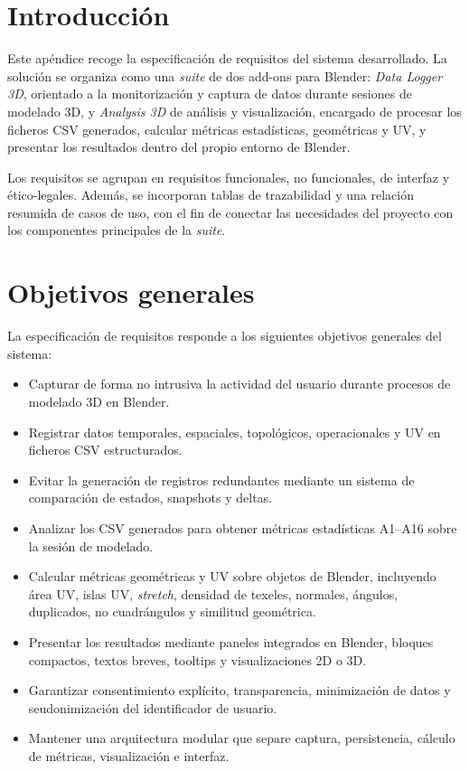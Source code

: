 \label{apendice:especificacion_requisitos}

\section{Introducción}

Este apéndice recoge la especificación de requisitos del sistema desarrollado. La solución se organiza como una \textit{suite} de dos add-ons para Blender: \textit{Data Logger 3D}, orientado a la monitorización y captura de datos durante sesiones de modelado 3D, y \textit{Analysis 3D} de análisis y visualización, encargado de procesar los ficheros CSV generados, calcular métricas estadísticas, geométricas y UV, y presentar los resultados dentro del propio entorno de Blender.

Los requisitos se agrupan en requisitos funcionales, no funcionales, de interfaz y ético-legales. Además, se incorporan tablas de trazabilidad y una relación resumida de casos de uso, con el fin de conectar las necesidades del proyecto con los componentes principales de la \textit{suite}.

\section{Objetivos generales}

La especificación de requisitos responde a los siguientes objetivos generales del sistema:

\begin{itemize}
    \item Capturar de forma no intrusiva la actividad del usuario durante procesos de modelado 3D en Blender.
    \item Registrar datos temporales, espaciales, topológicos, operacionales y UV en ficheros CSV estructurados.
    \item Evitar la generación de registros redundantes mediante un sistema de comparación de estados, snapshots y deltas.
    \item Analizar los CSV generados para obtener métricas estadísticas A1--A16 sobre la sesión de modelado.
    \item Calcular métricas geométricas y UV sobre objetos de Blender, incluyendo área UV, islas UV, \textit{stretch}, densidad de texeles, normales, ángulos, duplicados, no cuadrángulos y similitud geométrica.
    \item Presentar los resultados mediante paneles integrados en Blender, bloques compactos, textos breves, tooltips y visualizaciones 2D o 3D.
    \item Garantizar consentimiento explícito, transparencia, minimización de datos y seudonimización del identificador de usuario.
    \item Mantener una arquitectura modular que separe captura, persistencia, cálculo de métricas, visualización e interfaz.
\end{itemize}

